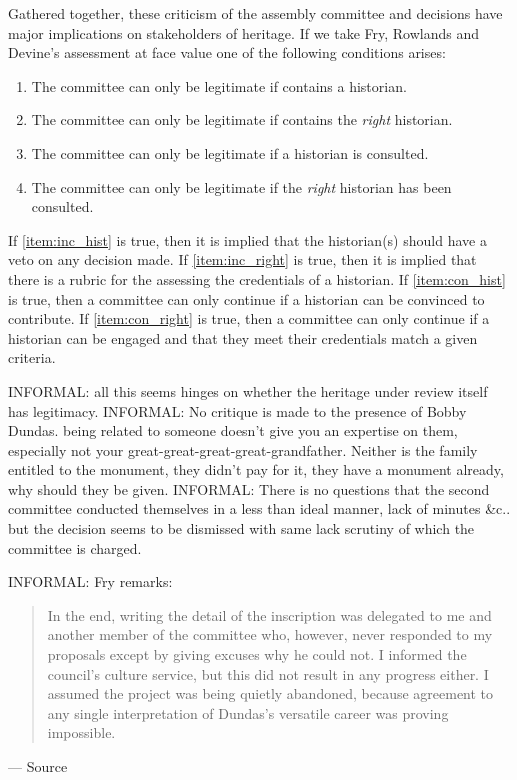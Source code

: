 Gathered together, these criticism of the assembly committee and decisions have major implications on stakeholders of heritage. If we take Fry, Rowlands and Devine's assessment at face value one of the following conditions arises:

\begin{enumerate}
    \item The committee can only be legitimate if contains a historian. \label{item:inc_hist}
    \item The committee can only be legitimate if contains the \textit{right} historian. \label{item:inc_right}
    \item The committee can only be legitimate if a historian is consulted. \label{item:con_hist}
    \item The committee can only be legitimate if the \textit{right} historian has been consulted.\label{item:inc_right}
\end{enumerate}

If \ref{item:inc_hist} is true, then it is implied that the historian(s) should have a veto on any decision made.
If \ref{item:inc_right} is true, then it is implied that there is a rubric for the assessing the credentials of a historian.
If \ref{item:con_hist} is true, then a committee can only continue if a historian can be convinced to contribute.
If \ref{item:con_right} is true, then a committee can only continue if a historian can be engaged and that they meet their credentials match a given criteria.


INFORMAL: all this seems hinges on whether the heritage under review itself has legitimacy. 
INFORMAL: No critique is made to the presence of Bobby Dundas. being related to someone doesn't give you an expertise on them, especially not your great-great-great-great-grandfather. Neither is the family entitled to the monument, they didn't pay for it, they have a monument already, why should they be given.
INFORMAL: There is no questions that the second committee conducted themselves in a less than ideal manner, lack of minutes  \&c.. \cite{scotsman_2022} but the decision seems to be dismissed with same lack scrutiny of which the committee is charged.

INFORMAL: Fry remarks:

\begin{quotation}
    In the end, writing the detail of the inscription was delegated to me and another member of the committee who, however, never responded to my proposals except by giving excuses why he could not. I informed the council’s culture service, but this did not result in any progress either. I assumed the project was being quietly abandoned, because agreement to any single interpretation of Dundas’s versatile career was proving impossible.
\end{quotation}
\begin{flushright}
    --- Source \cite{fry_2020}
\end{flushright}

